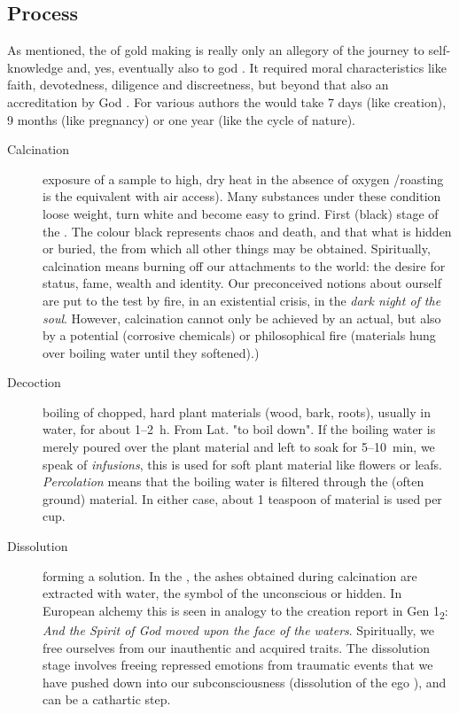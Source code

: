 \documentclass[british,final,landscape]{scrartcl}
\begin{document}
\begin{refsection}
\section{Process}

As mentioned, the  of gold making is really only an allegory of the journey to self-knowledge and, yes, eventually also to god \parencite{Rip-71, Jun-44}. It required moral characteristics like faith, devotedness, diligence and discreetness, but beyond that also an accreditation by God \parencite{Das-unk}. For various authors the  would take 7 days (like creation), 9 months (like pregnancy) or one year (like the cycle of nature).

\begin{description}
  \item[Calcination]{exposure of a sample to high, dry heat in the absence of oxygen /roasting is the equivalent with air access). Many substances under these condition loose weight, turn white and become easy to grind. First (black) stage of the . The colour black represents chaos and death, and that what is hidden or buried, the  from which all other things may be obtained. Spiritually, calcination means burning off our attachments to the world: the desire for status, fame, wealth and identity. Our preconceived notions about ourself are put to the test by fire, in an existential crisis, in the \emph{dark night of the soul}. However, calcination cannot only be achieved by an actual, but also by a potential (corrosive chemicals) or philosophical fire (materials hung over boiling water until they softened).)}
  \item[Decoction]{boiling of chopped, hard plant materials (wood, bark, roots), usually in water, for about \num{1}--\SI{2}{h}. From Lat.  "to boil down". If the boiling water is merely poured over the plant material and left to soak for \num{5}--\SI{10}{min}, we speak of \emph{infusions}, this is used for soft plant material like flowers or leafs. \emph{Percolation} means that the boiling water is filtered through the (often ground) material. In either case, about 1 teaspoon of material is used per cup.  }
  \item[Dissolution]{forming a solution. In the , the ashes obtained during calcination are extracted with water, the symbol of the unconscious or hidden. In European alchemy this is seen in analogy to the creation report in Gen 1\textsubscript{2}: \emph{And the Spirit of God moved upon the face of the waters}. Spiritually, we free ourselves from our inauthentic and acquired traits. The dissolution stage involves freeing repressed emotions from traumatic events that we have pushed down into our subconsciousness (dissolution of the ego \parencite{Jun-44}), and can be a cathartic step.}

\end{description}
\end{refsection}
\end{document}
